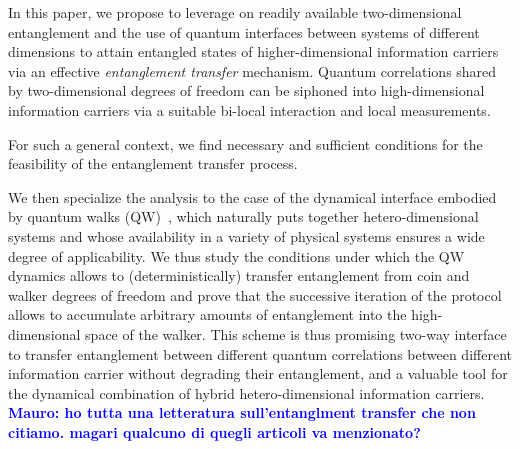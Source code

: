 \documentclass[
	aps, pra,
	superscriptaddress, twocolumn,
	floatfix,
	10pt
]{revtex4-1}
\newcommand{\parTitle}[1]{\noindent{\color{Mahogany}(\emph{#1})}}
\newcommand{\MP}[1]{\textcolor{blue}{Mauro: #1}}
\renewcommand{\parTitle}[1]{}
\begin{document}
In this paper, we propose to leverage on readily available two-dimensional entanglement and the use of quantum interfaces between systems of different dimensions to attain entangled  states of higher-dimensional information carriers via an effective {\it entanglement transfer} mechanism. Quantum correlations shared by two-dimensional degrees of freedom can be siphoned into high-dimensional information carriers via a suitable bi-local interaction and local measurements. 
\parTitle{Results}
For such a general context, %
we find necessary and sufficient conditions for the feasibility of the entanglement transfer process.

We then specialize the analysis to the case of the dynamical interface embodied by quantum walks (QW)~\cite{aharonov1993quantum,nayak2000quantum,ambainis2001onedimensional,Kempe2003quantum,venegas-andraca2012quantum}, which naturally puts together hetero-dimensional systems and whose availability in a variety of physical systems ensures a wide degree of applicability. 
We thus study the conditions under which the QW dynamics allows to (deterministically) transfer entanglement from coin and walker degrees of freedom and prove that the successive iteration of the protocol allows to accumulate arbitrary amounts of entanglement into the high-dimensional space of the walker.
This scheme is thus promising two-way interface to transfer entanglement between different quantum correlations between different information carrier without degrading their entanglement, and a valuable tool for the dynamical combination of hybrid hetero-dimensional information carriers. \textcolor{blue}{\bf Mauro: ho tutta una letteratura sull'entanglment transfer che non citiamo. magari qualcuno di quegli articoli va menzionato?}
\end{document}
